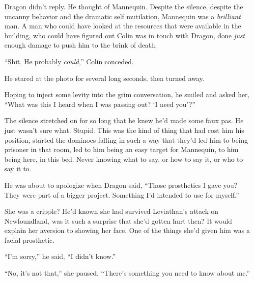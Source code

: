Dragon didn't reply.  He thought of Mannequin.  Despite the silence, despite the uncanny behavior and the dramatic self mutilation, Mannequin was a \emph{brilliant} man.  A man who could have looked at the resources that were available in the building, who could have figured out Colin was in touch with Dragon, done \emph{just} enough damage to push him to the brink of death.



``Shit.  He probably \emph{could},'' Colin conceded.



He stared at the photo for several long seconds, then turned away.



Hoping to inject some levity into the grim conversation, he smiled and asked her, ``What was this I heard when I was passing out?  `I need you'?''



The silence stretched on for so long that he knew he'd made some faux pas.  He just wasn't sure what.  Stupid.  This was the kind of thing that had cost him his position, started the dominoes falling in such a way that they'd led him to being prisoner in that room, led to him being an easy target for Mannequin, to him being here, in this bed.  Never knowing what to say, or how to say it, or who to say it to.



He was about to apologize when Dragon said, ``Those prosthetics I gave you?  They were part of a bigger project.  Something I'd intended to use for myself.''



She was a cripple?  He'd known she had survived Leviathan's attack on Newfoundland, was it such a surprise that she'd gotten hurt then?  It would explain her aversion to showing her face.  One of the things she'd given him was a facial prosthetic.



``I'm sorry,'' he said, ``I didn't know.''



``No, it's not that,'' she paused.  ``There's something you need to know about me.''






